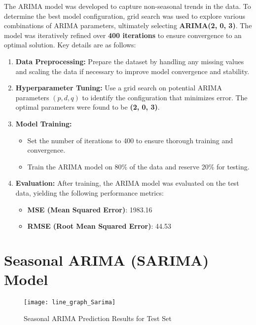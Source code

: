 The ARIMA model was developed to capture non-seasonal trends in the data. To determine the best model configuration, grid search was used to explore various combinations of ARIMA parameters, ultimately selecting \textbf{ARIMA(2, 0, 3)}. The model was iteratively refined over \textbf{400 iterations} to ensure convergence to an optimal solution. Key details are as follows:

\begin{enumerate}
	\item \textbf{Data Preprocessing:}  
	Prepare the dataset by handling any missing values and scaling the data if necessary to improve model convergence and stability.
	
	\item \textbf{Hyperparameter Tuning:}  
	Use a grid search on potential ARIMA parameters $(p, d, q)$ to identify the configuration that minimizes error. The optimal parameters were found to be \textbf{(2, 0, 3)}.
	
	\item \textbf{Model Training:}
	\begin{itemize}
		\item Set the number of iterations to 400 to ensure thorough training and convergence.
		\item Train the ARIMA model on 80\% of the data and reserve 20\% for testing.
	\end{itemize}
	
	\item \textbf{Evaluation:}  
	After training, the ARIMA model was evaluated on the test data, yielding the following performance metrics:
	\begin{itemize}
		\item \textbf{MSE (Mean Squared Error)}: 1983.16
		\item \textbf{RMSE (Root Mean Squared Error)}: 44.53
	\end{itemize}
\end{enumerate}


\section*{Seasonal ARIMA (SARIMA) Model}

\begin{figure}[H]
	\centering
	\texttt{[image: line\_graph\_Sarima]}
	\caption{Seasonal ARIMA Prediction Results for Test Set}
	\label{fig:Sarima_result}
\end{figure}


